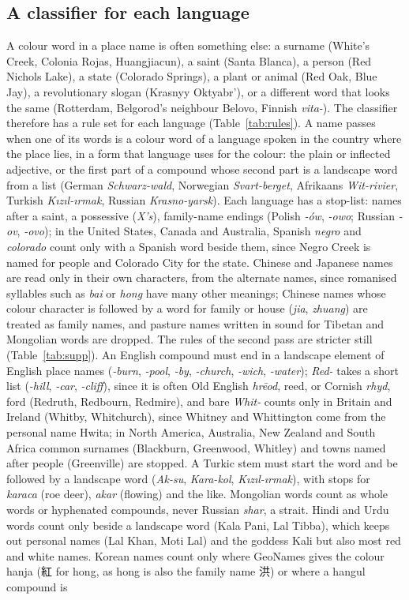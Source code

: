 \documentclass[11pt,a4paper]{article}
\begin{document}
\subsection{A classifier for each language}
A colour word in a place name is often something else: a surname (White's Creek, Colonia Rojas, Huangjiacun), a saint (Santa Blanca), a person (Red Nichols Lake), a state (Colorado Springs), a plant or animal (Red Oak, Blue Jay), a revolutionary slogan (Krasnyy Oktyabr'), or a different word that looks the same (Rotterdam, Belgorod's neighbour Belovo, Finnish \textit{vita-}). The classifier therefore has a rule set for each language (Table~\ref{tab:rules}). A name passes when one of its words is a colour word of a language spoken in the country where the place lies, in a form that language uses for the colour: the plain or inflected adjective, or the first part of a compound whose second part is a landscape word from a list (German \textit{Schwarz-wald}, Norwegian \textit{Svart-berget}, Afrikaans \textit{Wit-rivier}, Turkish \textit{Kızıl-ırmak}, Russian \textit{Krasno-yarsk}). Each language has a stop-list: names after a saint, a possessive (\textit{X's}), family-name endings (Polish \textit{-ów}, \textit{-owo}; Russian \textit{-ov}, \textit{-ovo}); in the United States, Canada and Australia, Spanish \textit{negro} and \textit{colorado} count only with a Spanish word beside them, since Negro Creek is named for people and Colorado City for the state. Chinese and Japanese names are read only in their own characters, from the alternate names, since romanised syllables such as \textit{bai} or \textit{hong} have many other meanings; Chinese names whose colour character is followed by a word for family or house (\textit{jia}, \textit{zhuang}) are treated as family names, and pasture names written in sound for Tibetan and Mongolian words are dropped. The rules of the second pass are stricter still (Table~\ref{tab:supp}). An English compound must end in a landscape element of English place names (\textit{-burn}, \textit{-pool}, \textit{-by}, \textit{-church}, \textit{-wich}, \textit{-water}); \textit{Red-} takes a short list (\textit{-hill}, \textit{-car}, \textit{-cliff}), since it is often Old English \textit{hr\=eod}, reed, or Cornish \textit{rhyd}, ford (Redruth, Redbourn, Redmire), and bare \textit{Whit-} counts only in Britain and Ireland (Whitby, Whitchurch), since Whitney and Whittington come from the personal name Hwita; in North America, Australia, New Zealand and South Africa common surnames (Blackburn, Greenwood, Whitley) and towns named after people (Greenville) are stopped. A Turkic stem must start the word and be followed by a landscape word (\textit{Ak-su}, \textit{Kara-kol}, \textit{Kızıl-ırmak}), with stops for \textit{karaca} (roe deer), \textit{akar} (flowing) and the like. Mongolian words count as whole words or hyphenated compounds, never Russian \textit{shar}, a strait. Hindi and Urdu words count only beside a landscape word (Kala Pani, Lal Tibba), which keeps out personal names (Lal Khan, Moti Lal) and the goddess Kali but also most red and white names. Korean names count only where GeoNames gives the colour hanja ({\cjk 紅} for hong, as hong is also the family name {\cjk 洪}) or where a hangul compound is 
\end{document}
